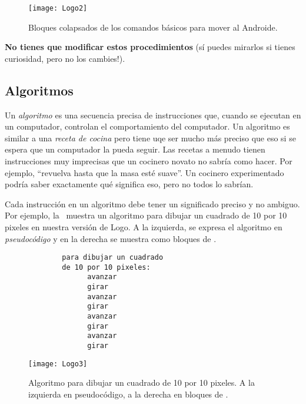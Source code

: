 \begin{figure}[H]
  \centering
  \texttt{[image: Logo2]}
  \caption{Bloques colapsados de los comandos básicos para mover al Androide.}
  \label{fig:Logo2}
\end{figure}

\textbf{No tienes que modificar estos procedimientos} (sí puedes
mirarlos si tienes curiosidad, pero no los cambies!).

\subsection*{Algoritmos}

Un \emph{algoritmo} es una secuencia precisa de instrucciones que,
cuando se ejecutan en un computador, controlan el comportamiento del
computador. Un algoritmo es similar a una \emph{receta de cocina} pero
tiene uqe ser mucho más preciso que eso si se espera que un computador
la pueda seguir. Las recetas a menudo tienen instrucciones muy
imprecisas que un cocinero novato no sabría como hacer. Por ejemplo,
``revuelva hasta que la masa esté suave''. Un cocinero experimentado
podría saber exactamente qué significa eso, pero no todos lo sabrían.

Cada instrucción en un algoritmo debe tener un significado preciso y
no ambiguo. Por ejemplo, la~ muestra un algoritmo para
dibujar un cuadrado de 10 por 10 pixeles en nuestra versión de Logo. A
la izquierda, se expresa el algoritmo en \emph{pseudocódigo} y en la
derecha se muestra como bloques de \AppInventor.

\begin{figure}[H]
\centering
\begin{minipage}{0.5\textwidth}
\centering
\begin{verbatim}
        para dibujar un cuadrado
        de 10 por 10 pixeles:
              avanzar
              girar
              avanzar
              girar
              avanzar
              girar
              avanzar
              girar
\end{verbatim}
\end{minipage}%
%
\begin{minipage}{0.5\textwidth}
  \centering
  \texttt{[image: Logo3]}
\end{minipage}
  \caption{Algoritmo para dibujar un cuadrado de 10 por 10 pixeles. A
    la izquierda en pseudocódigo, a la derecha en bloques de \AppInventor.}
  \label{fig:Logo3}
\end{figure}

